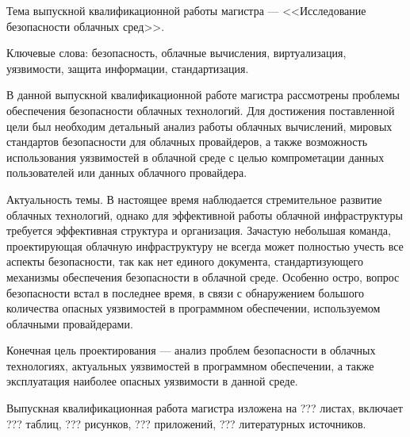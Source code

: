 
Тема выпускной квалификационной работы магистра --- <<Исследование безопасности облачных сред>>.

Ключевые слова: безопасность, облачные вычисления, виртуализация, уязвимости, защита информации, стандартизация.

В данной выпускной квалификационной работе магистра рассмотрены проблемы обеспечения безопасности облачных технологий.
Для достижения поставленной цели был необходим детальный анализ работы облачных вычислений, мировых стандартов безопасности для облачных провайдеров, а также возможность использования уязвимостей в облачной среде с целью компрометации данных пользователей или данных облачного провайдера.

Актуальность темы.
В настоящее время наблюдается стремительное развитие облачных технологий, однако для эффективной работы облачной инфраструктуры требуется эффективная структура и организация.
Зачастую небольшая команда, проектирующая облачную инфраструктуру не всегда может полностью учесть все аспекты безопасности, так как нет единого документа, стандартизующего механизмы обеспечения безопасности в облачной среде.
Особенно остро, вопрос безопасности встал в последнее время, в связи с обнаружением большого количества опасных уязвимостей в программном обеспечении, используемом облачными провайдерами.

Конечная цель проектирования --- анализ проблем безопасности в облачных технологиях, актуальных уязвимостей в программном обеспечении, а также эксплуатация наиболее опасных уязвимости в данной среде.

Выпускная квалификационная работа магистра изложена на ??? листах, включает ??? таблиц, ??? рисунков, ??? приложений, ??? литературных источников.

\clearpage
